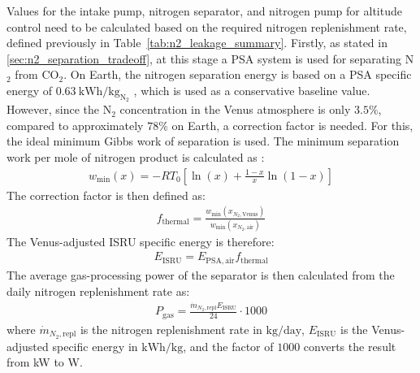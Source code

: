 Values for the intake pump, nitrogen separator, and nitrogen pump for altitude control need to be calculated based on the required nitrogen replenishment rate, defined previously in Table~\ref{tab:n2_leakage_summary}. Firstly, as stated in \autoref{sec:n2_separation_tradeoff}, at this stage a PSA system is used for separating N$_2$ from CO$_2$. On Earth, the nitrogen separation energy is based on a PSA specific energy of $0.63~\mathrm{kWh/kg_{N_2}}$ \cite{Rinker2024}, which is used as a conservative baseline value. However, since the N$_2$ concentration in the Venus atmosphere is only $3.5\%$, compared to approximately $78\%$ on Earth, a correction factor is needed. For this, the ideal minimum Gibbs work of separation is used. The minimum separation work per mole of nitrogen product is calculated as \cite{Ghoniem2020}:
\begin{align}
    w_{\min}(x) =
    -RT_0
    \left[
    \ln(x)
    +
    \frac{1-x}{x}\ln(1-x)
    \right]
\end{align}
The correction factor is then defined as:
\begin{align}
    f_{\mathrm{thermal}} =
    \frac{
    w_{\min}(x_{N_2,\mathrm{Venus}})
    }
    {
    w_{\min}(x_{N_2,\mathrm{air}})
    }
\end{align}
The Venus-adjusted ISRU specific energy is therefore:
\begin{align}
    E_{\mathrm{ISRU}} =
    E_{\mathrm{PSA,air}} f_{\mathrm{thermal}}
\end{align}
The average gas-processing power of the separator is then calculated from the daily nitrogen replenishment rate as:
\begin{align}
    P_{\mathrm{gas}} =
    \frac{
    \dot{m}_{N_2,\mathrm{repl}} E_{\mathrm{ISRU}}
    }
    {24}
    \cdot 1000
\end{align}
where $\dot{m}_{N_2,\mathrm{repl}}$ is the nitrogen replenishment rate in $\mathrm{kg/day}$, $E_{\mathrm{ISRU}}$ is the Venus-adjusted specific energy in $\mathrm{kWh/kg}$, and the factor of $1000$ converts the result from kW to W.

